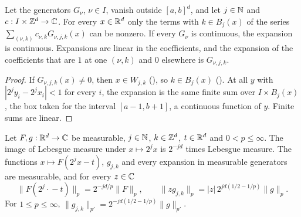 \begin{lemma}
\label{lem:daub-rd-expand-finite}
\leanok
{}
Let the generators $G_\nu$, $\nu \in I$, vanish outside $[a, b]^d$, and let $j \in \mathbb{N}$ and
$c : I \times \mathbb{Z}^d \to \mathbb{C}$. For every $x \in \mathbb{R}^d$ only the terms with $k \in B_j(x)$ of the
series $\sum_{(\nu, k)} c_{\nu,k} G_{\nu,j,k}(x)$ can be nonzero. If every $G_\nu$ is
continuous, the expansion is continuous. Expansions are linear in the coefficients, and the
expansion of the coefficients that are $1$ at one $(\nu, k)$ and $0$ elsewhere is $G_{\nu,j,k}$.
\end{lemma}

\begin{proof}
\leanok
{}
If $G_{\nu,j,k}(x) \neq 0$, then $x \in W_{j,k}$ (), so
$k \in B_j(x)$ (). At all $y$ with $|2^j y_i - 2^j x_i| < 1$ for every
$i$, the expansion is the same finite sum over $I \times B_j(x)$, the box taken for the interval
$[a - 1, b + 1]$, a continuous function of $y$. Finite sums are linear.
\end{proof}

\begin{lemma}
\label{lem:daub-rd-generator-norms}
\leanok
{}
Let $F, g : \mathbb{R}^d \to \mathbb{C}$ be measurable, $j \in \mathbb{N}$, $k \in \mathbb{Z}^d$, $t \in \mathbb{R}^d$ and
$0 < p \leq \infty$. The image of Lebesgue measure under $x \mapsto 2^j x$ is $2^{-jd}$ times
Lebesgue measure. The functions $x \mapsto F(2^j x - t)$, $g_{j,k}$ and every expansion in
measurable generators are measurable, and for every $z \in \mathbb{C}$
\[
  \|F(2^j \cdot {} - t)\|_p = 2^{-jd/p} \|F\|_p , \qquad
  \|z g_{j,k}\|_p = |z| \, 2^{jd(1/2 - 1/p)} \|g\|_p .
\]
For $1 \leq p \leq \infty$, $\|g_{j,k}\|_{p'} = 2^{-jd(1/2 - 1/p)} \|g\|_{p'}$.
\end{lemma}

